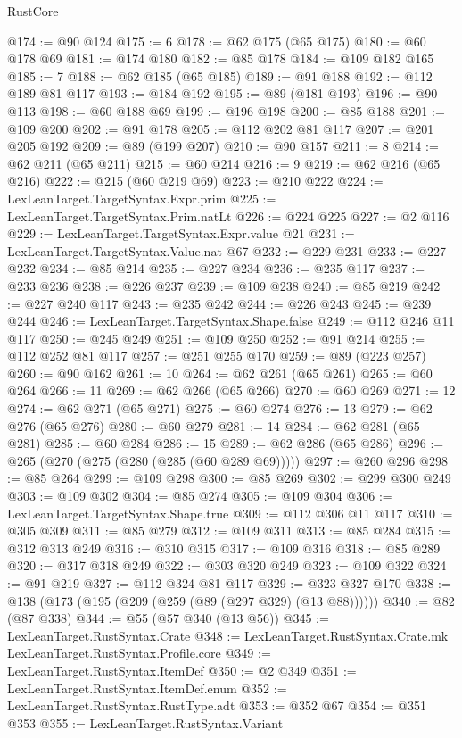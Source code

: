 \begin{lexlean}{RustCore}
\begin{coremodule}
@174 := @90 @124
@175 := 6
@178 := @62 @175 (@65 @175)
@180 := @60 @178 @69
@181 := @174 @180
@182 := @85 @178
@184 := @109 @182 @165
@185 := 7
@188 := @62 @185 (@65 @185)
@189 := @91 @188
@192 := @112 @189 @81 @117
@193 := @184 @192
@195 := @89 (@181 @193)
@196 := @90 @113
@198 := @60 @188 @69
@199 := @196 @198
@200 := @85 @188
@201 := @109 @200
@202 := @91 @178
@205 := @112 @202 @81 @117
@207 := @201 @205 @192
@209 := @89 (@199 @207)
@210 := @90 @157
@211 := 8
@214 := @62 @211 (@65 @211)
@215 := @60 @214
@216 := 9
@219 := @62 @216 (@65 @216)
@222 := @215 (@60 @219 @69)
@223 := @210 @222
@224 := LexLeanTarget.TargetSyntax.Expr.prim
@225 := LexLeanTarget.TargetSyntax.Prim.natLt
@226 := @224 @225
@227 := @2 @116
@229 := LexLeanTarget.TargetSyntax.Expr.value @21
@231 := LexLeanTarget.TargetSyntax.Value.nat @67
@232 := @229 @231
@233 := @227 @232
@234 := @85 @214
@235 := @227 @234
@236 := @235 @117
@237 := @233 @236
@238 := @226 @237
@239 := @109 @238
@240 := @85 @219
@242 := @227 @240 @117
@243 := @235 @242
@244 := @226 @243
@245 := @239 @244
@246 := LexLeanTarget.TargetSyntax.Shape.false
@249 := @112 @246 @11 @117
@250 := @245 @249
@251 := @109 @250
@252 := @91 @214
@255 := @112 @252 @81 @117
@257 := @251 @255 @170
@259 := @89 (@223 @257)
@260 := @90 @162
@261 := 10
@264 := @62 @261 (@65 @261)
@265 := @60 @264
@266 := 11
@269 := @62 @266 (@65 @266)
@270 := @60 @269
@271 := 12
@274 := @62 @271 (@65 @271)
@275 := @60 @274
@276 := 13
@279 := @62 @276 (@65 @276)
@280 := @60 @279
@281 := 14
@284 := @62 @281 (@65 @281)
@285 := @60 @284
@286 := 15
@289 := @62 @286 (@65 @286)
@296 := @265 (@270 (@275 (@280 (@285 (@60 @289 @69)))))
@297 := @260 @296
@298 := @85 @264
@299 := @109 @298
@300 := @85 @269
@302 := @299 @300 @249
@303 := @109 @302
@304 := @85 @274
@305 := @109 @304
@306 := LexLeanTarget.TargetSyntax.Shape.true
@309 := @112 @306 @11 @117
@310 := @305 @309
@311 := @85 @279
@312 := @109 @311
@313 := @85 @284
@315 := @312 @313 @249
@316 := @310 @315
@317 := @109 @316
@318 := @85 @289
@320 := @317 @318 @249
@322 := @303 @320 @249
@323 := @109 @322
@324 := @91 @219
@327 := @112 @324 @81 @117
@329 := @323 @327 @170
@338 := @138 (@173 (@195 (@209 (@259 (@89 (@297 @329) (@13 @88))))))
@340 := @82 (@87 @338)
@344 := @55 (@57 @340 (@13 @56))
@345 := LexLeanTarget.RustSyntax.Crate
@348 := LexLeanTarget.RustSyntax.Crate.mk LexLeanTarget.RustSyntax.Profile.core
@349 := LexLeanTarget.RustSyntax.ItemDef
@350 := @2 @349
@351 := LexLeanTarget.RustSyntax.ItemDef.enum
@352 := LexLeanTarget.RustSyntax.RustType.adt
@353 := @352 @67
@354 := @351 @353
@355 := LexLeanTarget.RustSyntax.Variant

\end{coremodule}
\end{lexlean}
